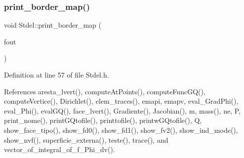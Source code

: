 \subsubsection{\texorpdfstring{print\+\_\+border\+\_\+map()}{print\_border\_map()}}
{\footnotesize\ttfamily void Stdel\+::print\+\_\+border\+\_\+map (\begin{DoxyParamCaption}\item[{F\+I\+LE $\ast$}]{fout }\end{DoxyParamCaption})\hspace{0.3cm}{\ttfamily [inline]}}



Definition at line 57 of file Stdel.\+h.



References aresta\+\_\+lvert(), compute\+At\+Points(), compute\+Func\+G\+Q(), compute\+Vertice(), Dirichlet(), elem\+\_\+traces(), emapi, emapv, eval\+\_\+\+Grad\+Phi(), eval\+\_\+\+Phi(), eval\+G\+Q(), face\+\_\+lvert(), Gradiente(), Jacobian(), m, mass(), ne, P, print\+\_\+nome(), print\+G\+Qtofile(), printtofile(), printw\+G\+Qtofile(), Q, show\+\_\+face\+\_\+tipo(), show\+\_\+fd0(), show\+\_\+fd1(), show\+\_\+fv2(), show\+\_\+ind\+\_\+mode(), show\+\_\+nvf(), superficie\+\_\+externa(), teste(), trace(), and vector\+\_\+of\+\_\+integral\+\_\+of\+\_\+f\+\_\+\+Phi\+\_\+dv().

